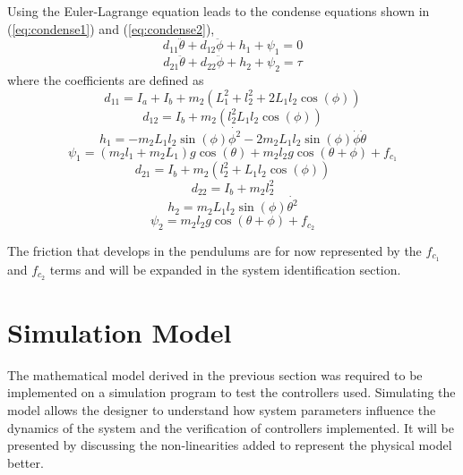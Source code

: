 Using the Euler-Lagrange equation leads to the condense equations shown in (\ref{eq:condense1}) and (\ref{eq:condense2}),
\begin{equation} \label{eq:condense1}
d_{11}\ddot{\theta}+d_{12}\ddot{\phi} + h_{1} + \psi_{1} = 0
\end{equation}
\begin{equation} \label{eq:condense2}
d_{21}\ddot{\theta} + d_{22}\ddot{\phi} + h_{2} + \psi_{2} = \tau
\end{equation}
where the coefficients are defined as
\begin{equation} \label{eq:d11}
d_{11} = I_{a} + I_{b} + m_{2}(L_{1}^2 + l_{2}^2+2L_{1}l_{2}\cos(\phi))
\end{equation}
\begin{equation} \label{eq:d12}
d_{12} = I_{b} +m_{2}(l_{2}^2 L_{1}l_{2}\cos(\phi))
\end{equation}
\begin{equation} \label{eq:h1}
h_{1} = -m_{2}L_{1}l_{2}\sin(\phi)\dot{\phi^2}-2m_{2}L_{1}l_{2}\sin(\phi)\dot{\phi}\dot{\theta}
\end{equation}
\begin{equation} \label{eq:psi1}
\psi_{1} = (m_{2}l_{1}+m_{2}L_{1})g\cos(\theta) + m_{2}l_{2}g\cos(\theta+\phi) + f_{c_{1}}
\end{equation}
\begin{equation} \label{eq:d21}
d_{21}= I_{b}+m_{2}(l_{2}^2+L_{1}l_{2}\cos(\phi))
\end{equation}
\begin{equation} \label{eq:d22}
d_{22}= I_{b}+ m_{2}l_{2}^2
\end{equation}
\begin{equation} \label{eq:h2}
h_{2}= m_{2}L_{1}l_{2}\sin(\phi)\dot{\theta^2}
\end{equation}
\begin{equation} \label{eq:psi2}
\psi_{2}= m_{2}l_{2}g\cos(\theta+\phi) + f_{c_{2}}
\end{equation}

The friction that develops in the pendulums are for now represented by the $f_{c_{1}}$ and $f_{c_{2}}$ terms and will be expanded in the system identification section.

\section{Simulation Model}
\label{sec:simulation_model}
The mathematical model derived in the previous section was required to be implemented on a simulation program to test the controllers used. Simulating the model allows the designer to understand how system parameters influence the dynamics of the system and the verification of controllers implemented. It will be presented by discussing the non-linearities added to represent the physical model better.\\

